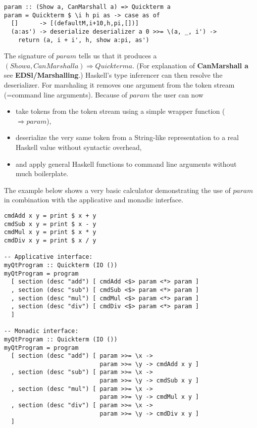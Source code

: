 \documentclass[a4paper]{article}
\begin{document}
\begin{lstlisting}
param :: (Show a, CanMarshall a) => Quickterm a
param = Quickterm $ \i h pi as -> case as of
  []      -> [(defaultM,i+10,h,pi,[])]
  (a:as') -> deserialize deserializer a 0 >>= \(a, _, i') ->
  	return (a, i + i', h, show a:pi, as')
\end{lstlisting}

The signature of $param$ tells us that it produces a $(Show a, CanMarshall a) \Rightarrow Quickterm a$. (For explanation of \textbf{CanMarshall a} see \textbf{EDSl/Marshalling}.) Haskell's type inferencer can then resolve the deserializer. For marshaling it removes one argument from the token stream (=command line arguments). Because of $param$ the user can now
\begin{itemize}
\item take tokens from the token stream using a simple wrapper function ($\Rightarrow param$),
\item deserialize the very same token from a String-like representation to a real Haskell value without syntactic overhead,
\item and apply general Haskell functions to command line arguments without much boilerplate.
\end{itemize}

The example below shows a very basic calculator demonstrating the use of $param$ in combination with the applicative and monadic interface.

\begin{lstlisting}
cmdAdd x y = print $ x + y
cmdSub x y = print $ x - y
cmdMul x y = print $ x * y
cmdDiv x y = print $ x / y

-- Applicative interface:
myQtProgram :: Quickterm (IO ())
myQtProgram = program
  [ section (desc "add") [ cmdAdd <$> param <*> param ]
  , section (desc "sub") [ cmdSub <$> param <*> param ]
  , section (desc "mul") [ cmdMul <$> param <*> param ]
  , section (desc "div") [ cmdDiv <$> param <*> param ]
  ]

-- Monadic interface:
myQtProgram :: Quickterm (IO ())
myQtProgram = program
  [ section (desc "add") [ param >>= \x ->
                           param >>= \y -> cmdAdd x y ]
  , section (desc "sub") [ param >>= \x ->
                           param >>= \y -> cmdSub x y ]
  , section (desc "mul") [ param >>= \x ->
                           param >>= \y -> cmdMul x y ]
  , section (desc "div") [ param >>= \x ->
                           param >>= \y -> cmdDiv x y ]
  ]
\end{lstlisting}
\end{document}
